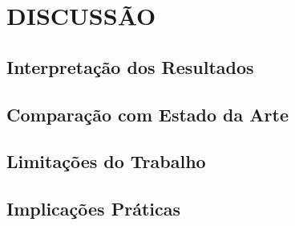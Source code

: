 \section{DISCUSSÃO}

\subsection{Interpretação dos Resultados}

\subsection{Comparação com Estado da Arte}

\subsection{Limitações do Trabalho}

\subsection{Implicações Práticas}
